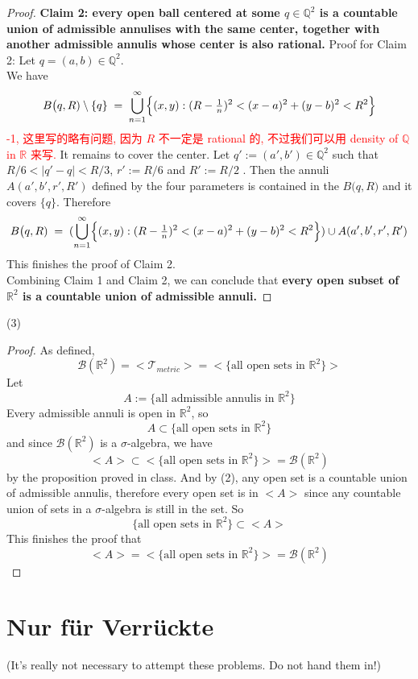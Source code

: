 \documentclass[lang=cn,11pt]{elegantbook}
\begin{document}
\begin{proof}
\textbf{Claim 2: every open ball centered at some $q\in \mathbb{Q}^2$ is a countable union of admissible annulises with the same center, together with another admissible annulis whose center is also rational.}
Proof for Claim 2: 
\noindent Let $q = (a,b) \in \mathbb{Q}^2$.\\
We have
\[    
   B\bigl(q, R)  \setminus \{q\}
   \;=\; 
   \bigcup_{n=1}^{\infty} \Bigl\{(x,y) : (R-\tfrac{1}{n})^2 < (x-a)^2 + (y-b)^2 < R^2\Bigr\}
\]
\textcolor{red}{-1, 这里写的略有问题, 因为 $R$ 不一定是 rational 的, 不过我们可以用 density of $\mathbb{Q}$ in $\mathbb{R}$ 来写.}
It remains to cover the center. Let $q' := (a',b') \in \mathbb{Q}^2$ such that $R/6 < |q' - q| < R/3$, $r' := R/6$ and $R' := R/2$ . Then the annuli $A(a',b',r',R')$ defined by the four parameters is contained in the $ B\bigl(q, R)$ and it covers $\{q\}$. 
Therefore
\[    
   B\bigl(q, R)
   \;=\; 
 (  \bigcup_{n=1}^{\infty} \Bigl\{(x,y) : (R-\tfrac{1}{n})^2 < (x-a)^2 + (y-b)^2 < R^2\Bigr\}) \cup A(a',b',r',R')
\]
This finishes the proof of Claim 2.\\
Combining Claim 1 and Claim 2, we can conclude that \textbf{every open subset of $\mathbb{R}^2$ is a countable union of admissible annuli.}\end{proof}

\noindent (3) 
\begin{proof}

As defined,
\[
\mathcal{B}(\mathbb{R}^2) = <\mathcal{T}_{metric}> = <\{\text{all open sets in }\mathbb{R}^2\}>
\]
 Let 
\[ A:=   \{     \text{all admissible annulis in $\mathbb{R}^2$}   \}\]
Every admissible annuli is open in $\mathbb{R}^2$, so 
\[
A \subset \{\text{all open sets in }\mathbb{R}^2\}
\]
and since $\mathcal{B}(\mathbb{R}^2)$ is a $\sigma$-algebra, we have 
\[
<A> \subset <\{\text{all open sets in }\mathbb{R}^2\}> =\mathcal{B}(\mathbb{R}^2)
\]by the proposition proved in class.
\noindent And by (2), any open set is a countable union of admissible annulis, therefore every open set is in $<A>$ since any countable union of sets in a $\sigma$-algebra is still in the set. So
\[   
 \{\text{all open sets in } \mathbb{R}^2\} \subset <A>
\]
This finishes the proof that 
\[
<A> = <\{\text{all open sets in }\mathbb{R}^2\}> =\mathcal{B}(\mathbb{R}^2)
\]
\end{proof}





\section*{Nur für Verrückte}
(It’s really not necessary to attempt these problems. Do not hand them in!)
\end{document}

